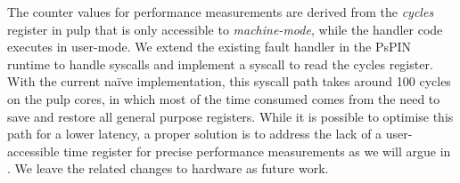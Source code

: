 The counter values for performance measurements are derived from the \emph{cycles} register in \ac{pulp} that is only accessible to \emph{machine-mode}, while the handler code executes in user-mode.  We extend the existing fault handler in the PsPIN runtime to handle syscalls and implement a syscall to read the cycles register.  With the current na\"ive implementation, this syscall path takes around 100 cycles on the \ac{pulp} cores, in which most of the time consumed comes from the need to save and restore all general purpose registers.  While it is possible to optimise this path for a lower latency, a proper solution is to address the lack of a user-accessible time register for precise performance measurements as we will argue in .  We leave the related changes to hardware as future work.